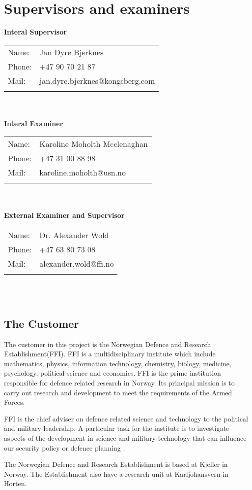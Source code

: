 \chapter{Supervisors and examiners}

\textbf{Interal Supervisor}\\
\begin{tabular}{ll}                                              
Name: 	            & Jan Dyre Bjerknes	         \\
Phone:		        & +47 90 70 21 87			     \\
Mail:	            & jan.dyre.bjerknes@kongsberg.com  \\\\      
\end{tabular}
\\\\
\textbf{Interal Examiner}\\
\begin{tabular}{ll}                                              
Name: 	            & Karoline Moholth Mcclenaghan   \\
Phone:		        & +47 31 00 88 98			     \\
Mail:	            & karoline.moholth@usn.no 	    \\\\      
\end{tabular}
\\\\
\textbf{External Examiner and Supervisor}\\
\begin{tabular}{ll}                                              
Name: 	            & Dr. Alexander Wold   \\
Phone:		        & +47 63 80 73 08			     \\
Mail:	            & alexander.wold@ffi.no 	    \\\\      
\end{tabular}
\\\




\section{The Customer}
The customer in this project is the Norwegian Defence and Research Establishment(FFI). FFI is a multidisciplinary institute which include mathematics, physics, information technology, chemistry, biology, medicine, psychology, political science and economics. FFI is the prime institution responsible for defence related research in Norway. Its principal mission is to carry out research and development to meet the requirements of the Armed Forces.\bigskip

FFI is the chief adviser on defence related science and technology to the political and military leadership. A particular task for the institute is to investigate aspects of the development in science and military technology that can influence our security policy or defence planning \cite{FFI}. \bigskip

The Norwegian  Defence and Research Establishment is based at Kjeller in Norway. The Establishment also have a research unit at Karljohansvern in Horten. 
